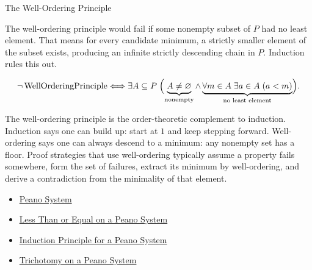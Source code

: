 \begin{topicbox}{The Well-Ordering Principle}
\begin{remark*}
The well-ordering principle would fail if some nonempty subset of $P$ had no
least element. That means for every candidate minimum, a strictly smaller
element of the subset exists, producing an infinite strictly descending chain
in $P$. Induction rules this out.
\end{remark*}

\begin{remark*}
\[
\neg\operatorname{WellOrderingPrinciple}
\Longleftrightarrow
\exists A \subseteq P\;
\Bigl(\underbrace{A \neq \varnothing}_{\text{nonempty}}
\land
\underbrace{\forall m \in A\;\exists a \in A\;(a < m)}_{\text{no least element}}
\Bigr).
\]
\end{remark*}

\begin{remark*}[Interpretation]
The well-ordering principle is the order-theoretic complement to induction.
Induction says one can build up: start at $1$ and keep stepping forward.
Well-ordering says one can always descend to a minimum: any nonempty set has
a floor. Proof strategies that use well-ordering typically assume a property
fails somewhere, form the set of failures, extract its minimum by
well-ordering, and derive a contradiction from the minimality of that element.
\end{remark*}

\begin{dependencies}
\begin{itemize}
  \item \hyperref[def:peano-system]{Peano System}
  \item \hyperref[def:less-than-or-equal-on-peano-system]{Less Than or Equal on a Peano System}
  \item \hyperref[thm:induction-principle-for-peano-system]{Induction Principle for a Peano System}
  \item \hyperref[thm:trichotomy-on-peano-system]{Trichotomy on a Peano System}
\end{itemize}
\end{dependencies}
\end{topicbox}

